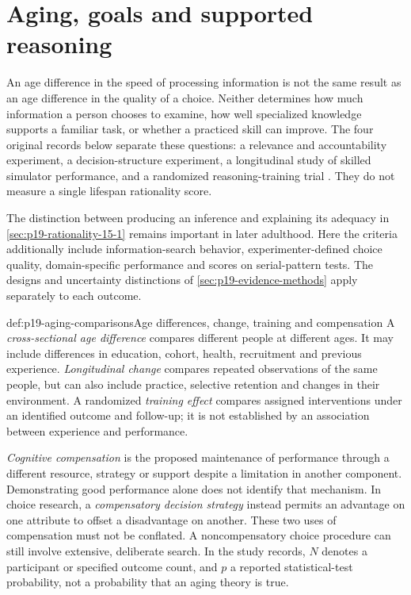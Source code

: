 \chapter{Aging, goals and supported reasoning}
\label{sec:p19-aging-goals-and-reasoning}

An age difference in the speed of processing information is not the same
result as an age difference in the quality of a choice. Neither determines
how much information a person chooses to examine, how well specialized
knowledge supports a familiar task, or whether a practiced skill can improve.
The four original records below separate these questions: a relevance and
accountability experiment, a decision-structure experiment, a longitudinal
study of skilled simulator performance, and a randomized reasoning-training
trial \cite{HessQueenEnnis2013Search,HessQueenPatterson2012Deliberation,
TaylorKennedyNodaYesavage2007Pilot,RebokEtAl2014ACTIVE}.
They do not measure a single lifespan rationality score.

The distinction between producing an inference and explaining its adequacy
in \cref{sec:p19-rationality-15-1} remains important in later adulthood.
Here the criteria additionally include information-search behavior,
experimenter-defined choice quality, domain-specific performance and scores
on serial-pattern tests. The designs and uncertainty distinctions of
\cref{sec:p19-evidence-methods} apply separately to each outcome.

\begin{hbdefinition}{def:p19-aging-comparisons}{Age differences, change, training and compensation}
A \emph{cross-sectional age difference} compares different people at
different ages. It may include differences in education, cohort, health,
recruitment and previous experience. \emph{Longitudinal change} compares
repeated observations of the same people, but can also include practice,
selective retention and changes in their environment. A randomized
\emph{training effect} compares assigned interventions under an identified
outcome and follow-up; it is not established by an association between
experience and performance.

\emph{Cognitive compensation} is the proposed maintenance of performance
through a different resource, strategy or support despite a limitation in
another component. Demonstrating good performance alone does not identify
that mechanism. In choice research, a \emph{compensatory decision strategy}
instead permits an advantage on one attribute to offset a disadvantage on
another. These two uses of compensation must not be conflated. A
noncompensatory choice procedure can still involve extensive, deliberate
search. In the study records, \(N\) denotes a participant or specified
outcome count, and \(p\) a reported statistical-test probability, not a
probability that an aging theory is true.
\end{hbdefinition}

